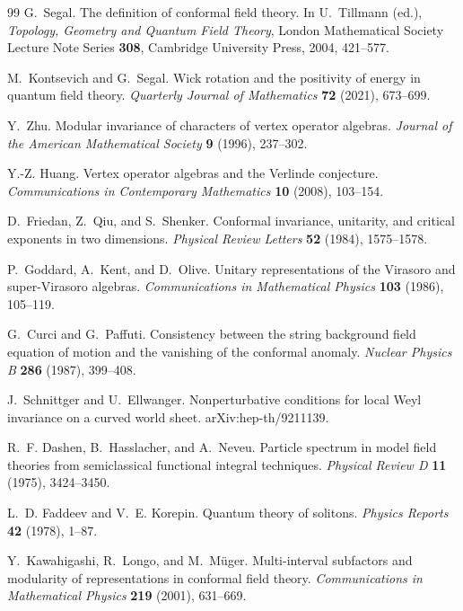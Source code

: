 \begin{thebibliography}{99}
G.~Segal.
The definition of conformal field theory.
In U.~Tillmann (ed.),
\emph{Topology, Geometry and Quantum Field Theory},
London Mathematical Society Lecture Note Series \textbf{308},
Cambridge University Press, 2004, 421--577.

M.~Kontsevich and G.~Segal.
Wick rotation and the positivity of energy in quantum field theory.
\emph{Quarterly Journal of Mathematics} \textbf{72} (2021), 673--699.

Y.~Zhu.
Modular invariance of characters of vertex operator algebras.
\emph{Journal of the American Mathematical Society} \textbf{9} (1996),
237--302.

Y.-Z. Huang.
Vertex operator algebras and the Verlinde conjecture.
\emph{Communications in Contemporary Mathematics} \textbf{10} (2008),
103--154.

D.~Friedan, Z.~Qiu, and S.~Shenker.
Conformal invariance, unitarity, and critical exponents in two dimensions.
\emph{Physical Review Letters} \textbf{52} (1984), 1575--1578.

P.~Goddard, A.~Kent, and D.~Olive.
Unitary representations of the Virasoro and super-Virasoro algebras.
\emph{Communications in Mathematical Physics} \textbf{103} (1986), 105--119.

G.~Curci and G.~Paffuti.
Consistency between the string background field equation of motion and the
vanishing of the conformal anomaly.
\emph{Nuclear Physics B} \textbf{286} (1987), 399--408.

J.~Schnittger and U.~Ellwanger.
Nonperturbative conditions for local Weyl invariance on a curved world sheet.
arXiv:hep-th/9211139.

R.~F. Dashen, B.~Hasslacher, and A.~Neveu.
Particle spectrum in model field theories from semiclassical functional
integral techniques.
\emph{Physical Review D} \textbf{11} (1975), 3424--3450.

L.~D. Faddeev and V.~E. Korepin.
Quantum theory of solitons.
\emph{Physics Reports} \textbf{42} (1978), 1--87.

Y.~Kawahigashi, R.~Longo, and M.~M\"uger.
Multi-interval subfactors and modularity of representations in conformal
field theory.
\emph{Communications in Mathematical Physics} \textbf{219} (2001), 631--669.


\end{thebibliography}
